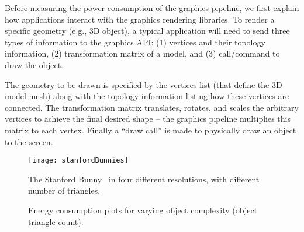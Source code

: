 Before measuring the power consumption of the graphics pipeline, we first explain how applications interact with the graphics rendering libraries. To render a specific geometry (e.g., 3D object), a typical application will need to send three types of information to the graphics API:  (1) vertices and their topology information, (2) transformation matrix of a model, and (3) call/command to draw the object.

The geometry to be drawn is specified by the vertices list (that define the 3D model mesh) along with the topology information listing how these vertices are connected. The transformation matrix translates, rotates, and scales the arbitrary vertices to achieve the final desired shape -- the graphics pipeline multiplies this matrix to each vertex. Finally a ``draw call'' is made to physically draw an object to the screen. 







\begin{figure}[t]
    \centering
    \texttt{[image: stanfordBunnies]}
    \caption{The Stanford Bunny~\cite{bunny} in four different resolutions, 
            with different number of triangles. 
            }
    \label{fig:bunny}
\end{figure}


\begin{figure}[t]
    \centering
    \vspace{-1ex}
    \hfill
    \vspace{-2ex}
    \caption{Energy consumption plots for varying object complexity (object triangle count).}
    \label{fig:complexity}
\end{figure}




